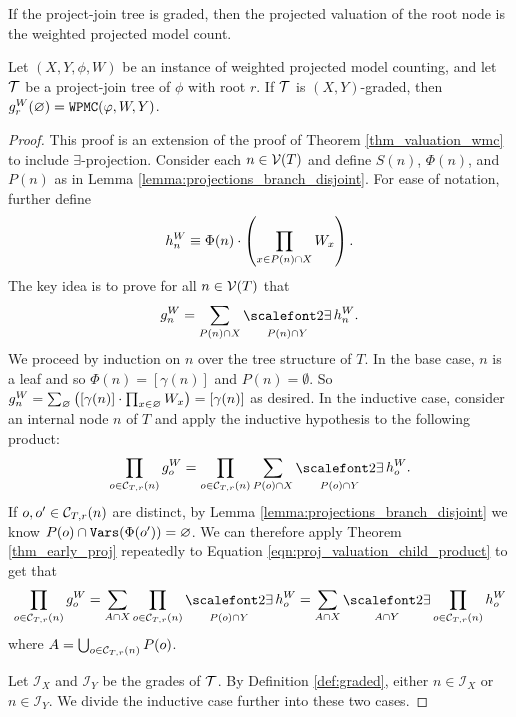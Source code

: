 If the project-join tree is graded, then the projected valuation of the root node is the weighted projected model count.
\begin{theorem}
\label{thm:proj_valuation}
Let $(X, Y, \phi, W)$ be an instance of weighted projected model counting, and let $\mathcal{T}$ be a project-join tree of $\phi$ with root $r$. 
If $\mathcal{T}$ is $(X, Y)$-graded, then $g^W_r(\varnothing) = \texttt{\upshape WPMC}(\varphi, W, Y)$.
\end{theorem}
\begin{proof}
This proof is an extension of the proof of Theorem \ref{thm_valuation_wmc} to include $\exists$-projection. 
Consider each $n \in \mathcal{V}(T)$ and define $S(n)$, $\Phi(n)$, and $P(n)$ as in Lemma \ref{lemma:projections_branch_disjoint}. For ease of notation, further define 
$$h^W_n \equiv \Phi(n) \cdot \left( \prod_{x \in P(n) \cap X} W_x \right).$$
The key idea is to prove for all $n \in \mathcal{V}(T)$ that 
$$g^W_n = \sum_{P(n) \cap X} \displaystyle\exist_{P(n) \cap Y} h^W_n \label{eqn:proj-valuation:correctness}.$$
We proceed by induction on $n$ over the tree structure of $T$. In the base case, $n$ is a leaf and so $\Phi(n) = [\gamma(n)]$ and $P(n) = \emptyset$. So $g^W_n = \sum_{\varnothing} \left(  [\gamma(n)] \cdot \prod_{x \in \varnothing} W_x  \right) = [\gamma(n)]$ as desired. In the inductive case, consider an internal node $n$ of $T$ and apply the inductive hypothesis to the following product:
\begin{equation}
\label{eqn:proj_valuation_child_product}
    \prod_{o \in \C T r n} g^W_o = \prod_{o \in \C T r n} \sum_{P(o) \cap X} \displaystyle\exist_{P(o) \cap Y} h^W_o.
\end{equation}
If $o, o' \in \mathcal{C}_{T,r}(n)$ are distinct, by Lemma \ref{lemma:projections_branch_disjoint} we know $P(o) \cap \texttt{\upshape Vars}(\Phi(o')) = \varnothing$. We can therefore apply Theorem \ref{thm_early_proj} repeatedly to Equation \ref{eqn:proj_valuation_child_product} to get that
\begin{equation}
\prod_{o \in \C{T}{r}{n}} g^W_o = \sum_{A \cap X} \prod_{o \in \C{T}{r}{n}} \displaystyle\exist_{P(o) \cap Y} h^W_o = \sum_{A \cap X} \displaystyle\exist_{A \cap Y} \prod_{o \in \C{T}{r}{n}} h^W_o \label{eq_child_prod}
\end{equation}
where $A = \bigcup_{o \in \mathcal{C}_{T,r}(n)} P(o)$.

Let $\mathcal{I}_X$ and $\mathcal{I}_Y$ be the grades of $\mathcal{T}$. By Definition \ref{def:graded}, either $n \in \mathcal{I}_X$ or $n \in \mathcal{I}_Y$. We divide the inductive case further into these two cases.


\end{proof}
